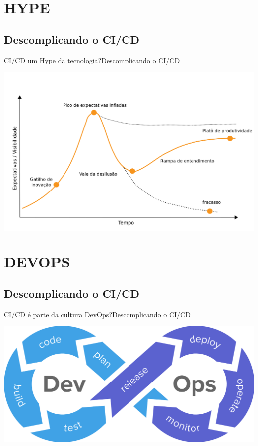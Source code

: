 \documentclass[10pt]{beamer}
\begin{document}
\section{HYPE}
\subsection{Descomplicando o CI/CD}
\begin{frame}{CI/CD um Hype da tecnologia?}{Descomplicando o CI/CD}
    \begin{center}
     \includegraphics[scale=0.25]{images/hype.png}
    \end{center}
\end{frame}

\section{DEVOPS}
\subsection{Descomplicando o CI/CD}
\begin{frame}{CI/CD é parte da cultura DevOps?}{Descomplicando o CI/CD}
    \begin{center}
     \includegraphics[scale=0.25]{images/devops}
    \end{center}
\end{frame}
\end{document}
